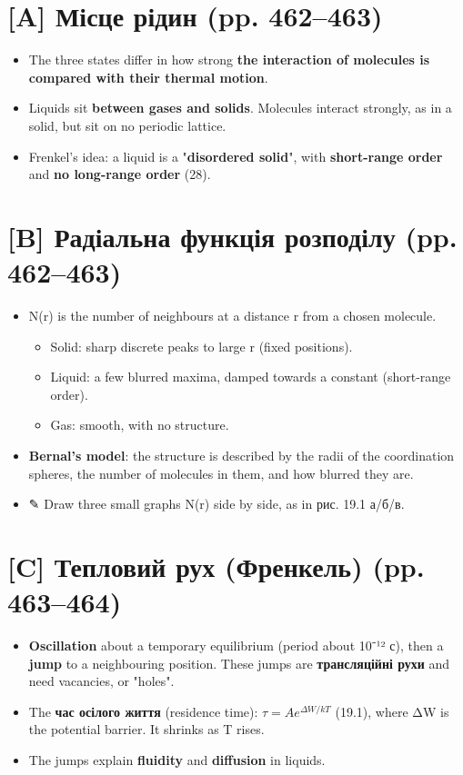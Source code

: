\documentclass[11pt,a4paper,oneside]{book}
\newcommand{\pen}{{\sffamily\color{accent}✎}}
\begin{document}
\section*{[A] Місце рідин (pp. 462–463)}
\begin{itemize}
\item The three states differ in how strong \textbf{the interaction of molecules is compared with their thermal motion}.
\item Liquids sit \textbf{between gases and solids}. Molecules interact strongly, as in a solid, but sit on no periodic lattice.
\item Frenkel's idea: a liquid is a "\textbf{disordered solid}", with \textbf{short-range order} and \textbf{no long-range order} (28).
\end{itemize}

\section*{[B] Радіальна функція розподілу (pp. 462–463)}
\begin{itemize}
\item N(r) is the number of neighbours at a distance r from a chosen molecule.
\begin{itemize}
\item Solid: sharp discrete peaks to large r (fixed positions).
\item Liquid: a few blurred maxima, damped towards a constant (short-range order).
\item Gas: smooth, with no structure.
\end{itemize}
\item \textbf{Bernal's model}: the structure is described by the radii of the coordination spheres, the number of molecules in them, and how blurred they are.
\item \pen{} Draw three small graphs N(r) side by side, as in рис. 19.1 а/б/в.
\end{itemize}

\section*{[C] Тепловий рух (Френкель) (pp. 463–464)}
\begin{itemize}
\item \textbf{Oscillation} about a temporary equilibrium (period about 10⁻¹² с), then a \textbf{jump} to a neighbouring position. These jumps are \textbf{трансляційні рухи} and need vacancies, or "holes".
\item The \textbf{час осілого життя} (residence time): $\tau = Ae^{\Delta W/kT}$ (19.1), where ΔW is the potential barrier. It shrinks as T rises.
\item The jumps explain \textbf{fluidity} and \textbf{diffusion} in liquids.
\end{itemize}
\end{document}
